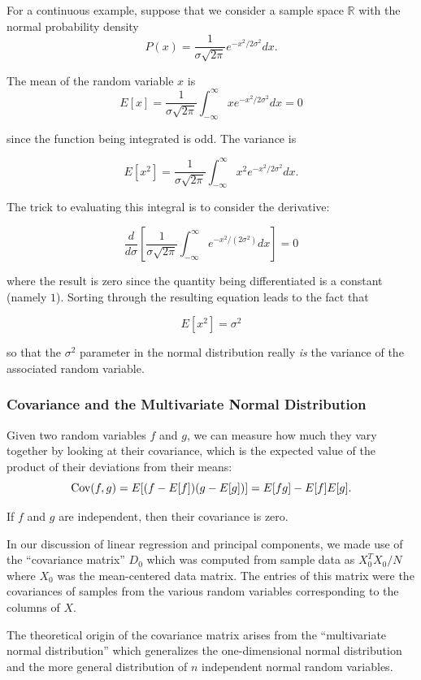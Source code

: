 \documentclass[
  11pt,
  letterpaper,
]{scrbook}
\theoremstyle{plain}
\theoremstyle{remark}
\begin{document}
For a continuous example, suppose that we consider a sample space
\(\mathbb{R}\) with the normal probability density \[
P(x) = \frac{1}{\sigma\sqrt{2\pi}}e^{-x^2/2\sigma^2}dx.
\]

The mean of the random variable \(x\) is \[
E[x] =\frac{1}{\sigma\sqrt{2\pi}}\int_{-\infty}^{\infty} xe^{-x^2/2\sigma^2}dx=0
\]

since the function being integrated is odd. The variance is

\[
E[x^2] = \frac{1}{\sigma\sqrt{2\pi}}\int_{-\infty}^{\infty} x^2e^{-x^2/2\sigma^2}dx.
\]

The trick to evaluating this integral is to consider the derivative:

\[
\frac{d}{d\sigma}\left[\frac{1}{\sigma\sqrt{2\pi}}\int_{-\infty}^{\infty}e^{-x^2/(2\sigma^2)}dx\right]=0
\]

where the result is zero since the quantity being differentiated is a
constant (namely \(1\)). Sorting through the resulting equation leads to
the fact that

\[
E[x^2]=\sigma^2
\]

so that the \(\sigma^2\) parameter in the normal distribution really
\emph{is} the variance of the associated random variable.

\hypertarget{covariance-and-the-multivariate-normal-distribution}{%
\subsubsection{Covariance and the Multivariate Normal
Distribution}\label{covariance-and-the-multivariate-normal-distribution}}

Given two random variables \(f\) and \(g\), we can measure how much they
vary together by looking at their covariance, which is the expected
value of the product of their deviations from their means: \[
\hbox{Cov}(f,g) = E[(f-E[f])(g-E[g])]=E[fg]-E[f]E[g].
\]

If \(f\) and \(g\) are independent, then their covariance is zero.

In our discussion of linear regression and principal components, we made
use of the ``covariance matrix'' \(D_{0}\) which was computed from
sample data as \(X_{0}^{T}X_{0}/N\) where \(X_{0}\) was the
mean-centered data matrix. The entries of this matrix were the
covariances of samples from the various random variables corresponding
to the columns of \(X\).

The theoretical origin of the covariance matrix arises from the
``multivariate normal distribution'' which generalizes the
one-dimensional normal distribution and the more general distribution of
\(n\) independent normal random variables.
\end{document}
